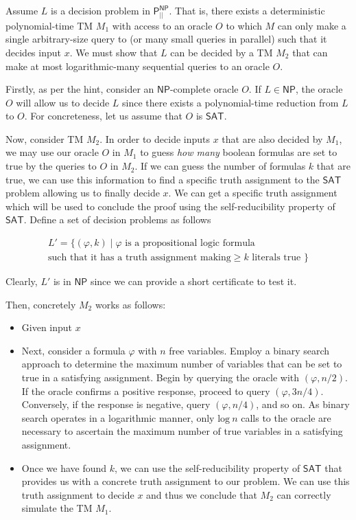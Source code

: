 \begin{question}
\begin{answer}
    Assume $L$ is a decision problem in $\mathsf{P}_{||}^{\mathsf{NP}} $. That is, there exists a deterministic polynomial-time TM $M_1$ with access to an oracle $O$ to which $M$ can only make a single arbitrary-size query to (or many small queries in parallel) such that it decides input $x$. We must show that $L$ can be decided by a TM $M_2$ that can make at most logarithmic-many sequential queries to an oracle $O$.

    \par Firstly, as per the hint, consider an $\mathsf{NP}$-complete oracle $O$. If $L \in \mathsf{NP}$, the oracle $O$ will allow us to decide $L$ since there exists a polynomial-time reduction from $L$ to $O$. For concreteness, let us assume that $O$ is $\mathsf{SAT}$.

    \par Now, consider TM $M_2$. In order to decide inputs $x$ that are also decided by $M_1$, we may use our oracle $O$ in $M_1$ to guess \textit{how many} boolean formulas are set to true by the queries to $O$ in $M_2$. If we can guess the number of formulas $k$ that are true, we can use this information to find a specific truth assignment to the $\mathsf{SAT}$ problem allowing us to finally decide $x$. We can get a specific truth assignment which will be used to conclude the proof using the self-reducibility property of $\mathsf{SAT}$.
    Define a set of decision problems as follows

    \begin{gather*}
        L'=\{(\varphi, k)\mid \varphi \text{ is a propositional logic formula}
        \\
        \text{such that it has a truth assignment making} \geq k \text{ literals true } \}
    \end{gather*}

    Clearly, $L'$ is in $\mathsf{NP}$ since we can provide a short certificate to test it.

    Then, concretely $M_2$ works as follows:
    \begin{itemize}
        \item Given input $x$
        \item Next, consider a formula $\varphi$ with $n$ free variables. Employ a binary search approach to determine the maximum number of variables that can be set to true in a satisfying assignment. Begin by querying the oracle with $(\varphi, n/2)$. If the oracle confirms a positive response, proceed to query $(\varphi, 3n/4)$. Conversely, if the response is negative, query $(\varphi, n/4)$, and so on. As binary search operates in a logarithmic manner, only $\text{log} \ n$ calls to the oracle are necessary to ascertain the maximum number of true variables in a satisfying assignment.
        \item Once we have found $k$, we can use the self-reducibility property of $\mathsf{SAT}$ that provides us with a concrete truth assignment to our problem. We can use this truth assignment to decide $x$ and thus we conclude that $M_2$ can correctly simulate the TM $M_1$.
    \end{itemize}


\end{answer}
\end{question}
